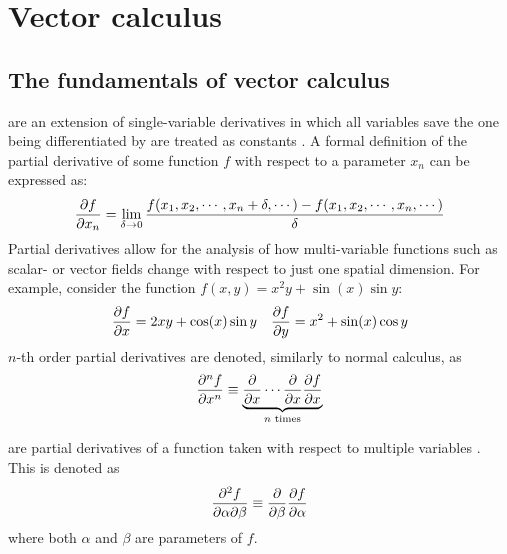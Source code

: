 \section{Vector calculus}
\subsection{The fundamentals of vector calculus}

\begin{defn}
	 are an extension of single-variable derivatives in which all variables save
	the one being differentiated by are treated as constants \cite{MORTIMER201389}. A formal definition of the
	partial derivative of some function $f$ with respect to a parameter $x_n$ can be expressed as:
	\begin{equation}
		\pdv{f}{x_n}=\lim_{\delta\rightarrow0}\frac{f(x_1,x_2,\cdots,x_n+\delta,\cdots)-f(x_1,x_2,\cdots,x_n,\cdots)}{\delta}
	\end{equation}
	Partial derivatives allow for the analysis of how multi-variable functions such as scalar- or vector fields change
	with respect to just one spatial dimension. For example, consider the function $f(x,y)=x^2y+\sin(x)\sin y$:
	\begin{align*}
		\pdv{f}{x}=2xy+\cos(x)\sin y&&\pdv{f}{y}=x^2+\sin(x)\cos y
	\end{align*}
	$n$-th order partial derivatives are denoted, similarly to normal calculus, as
	$$
	\pdv[n]{f}{x}\equiv\underbrace{\pdv{x}\cdots\pdv{x}\pdv{f}{x}}_{n\text{ times}}
	$$
\end{defn}
\begin{defn}
	 are partial derivatives of a function taken with respect to multiple
	variables \cite{GARRETT2015377}. This is denoted as
	$$
	\pdv{f}{\alpha}{\beta}\equiv\pdv{\beta}\pdv{f}{\alpha}
	$$
	where both $\alpha$ and $\beta$ are parameters of $f$.
\end{defn}
